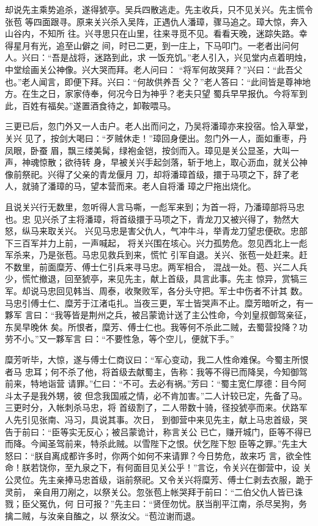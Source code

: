 却说先主乘势追杀，遂得猇亭。吴兵四散逃走。先主收兵，只不见关兴。先主慌令张苞
等四面跟寻。原来关兴杀入吴阵，正遇仇人潘璋，骤马追之。璋大惊，奔入山谷内，不知所
往。兴寻思只在山里，往来寻觅不见。看看天晚，迷踪失路。幸得星月有光，追至山僻之
间，时已二更，到一庄上，下马叩门。一老者出问何人。兴曰：“吾是战将，迷路到此，求
一饭充饥。”老人引入，兴见堂内点着明烛，中堂绘画关公神像。兴大哭而拜。老人问曰：
“将军何故哭拜？”兴曰：“此吾父也。”老人闻言，即便下拜。兴曰：“何故供养吾
父？”老人答曰：“此间皆是尊神地方。在生之日，家家侍奉，何况今日为神乎？老夫只望
蜀兵早早报仇。今将军到此，百姓有福矣。”遂置酒食待之，卸鞍喂马。

三更已后，忽门外又一人击户。老人出而问之，乃吴将潘璋亦来投宿。恰入草堂，关兴
见了，按剑大喝曰：“歹贼休走！”璋回身便出。忽门外一人，面如重枣，丹凤眼，卧蚕
眉，飘三缕美髯，绿袍金铠，按剑而入。璋见是关公显圣，大叫一声，神魂惊散；欲待转
身，早被关兴手起剑落，斩于地上，取心沥血，就关公神像前祭祀。兴得了父亲的青龙偃月
刀，却将潘璋首级，擐于马项之下，辞了老人，就骑了潘璋的马，望本营而来。老人自将潘
璋之尸拖出烧化。

且说关兴行无数里，忽听得人言马嘶，一彪军来到；为首一将，乃潘璋部将马忠也。忠
见兴杀了主将潘璋，将首级擐于马项之下，青龙刀又被兴得了，勃然大怒，纵马来取关兴。
兴见马忠是害父仇人，气冲牛斗，举青龙刀望忠便砍。忠部下三百军并力上前，一声喊起，
将关兴围在垓心。兴力孤势危。忽见西北上一彪军杀来，乃是张苞。马忠见救兵到来，慌忙
引军自退。关兴、张苞一处赶来。赶不数里，前面糜芳、傅士仁引兵来寻马忠。两军相合，
混战一处。苞、兴二人兵少，慌忙撤退，回至猇亭，来见先主，献上首级，具言此事。先主
惊异，赏犒三军。却说马忠回见韩当、周泰，收聚败军，各分头守把。军士中伤者不计其
数。马忠引傅士仁、糜芳于江渚屯扎。当夜三更，军士皆哭声不止。糜芳暗听之，有一夥军
言曰：“我等皆是荆州之兵，被吕蒙诡计送了主公性命，今刘皇叔御驾亲征，东吴早晚休
矣。所恨者，糜芳、傅士仁也。我等何不杀此二贼，去蜀营投降？功劳不小。”又一夥军言
曰：“不要性急，等个空儿，便就下手。”

糜芳听毕，大惊，遂与傅士仁商议曰：“军心变动，我二人性命难保。今蜀主所恨者马
忠耳；何不杀了他，将首级去献蜀主，告称：我等不得已而降吴，今知御驾前来，特地诣营
请罪。”仁曰：“不可。去必有祸。”芳曰：“蜀主宽仁厚德：目今阿斗太子是我外甥，彼
但念我国戚之情，必不肯加害。”二人计较已定，先备了马。三更时分，入帐刺杀马忠，将
首级割了，二人带数十骑，径投猇亭而来。伏路军人先引见张南、冯习，具说其事。次日，
到御营中来见先主，献上马忠首级，哭告于前曰：“臣等实无反心；被吕蒙诡计，称言关公
已亡，赚开城门，臣等不得已而降。今闻圣驾前来，特杀此贼。以雪陛下之恨。伏乞陛下恕
臣等之罪。”先主大怒曰：“朕自离成都许多时，你两个如何不来请罪？今日势危，故来巧
言，欲全性命！朕若饶你，至九泉之下，有何面目见关公乎！”言讫，令关兴在御营中，设
关公灵位。先主亲捧马忠首级，诣前祭祀。又令关兴将糜芳、傅士仁剥去衣服，跪于灵前，
亲自用刀剐之，以祭关公。忽张苞上帐哭拜于前曰：“二伯父仇人皆已诛戮；臣父冤仇，何
日可报？”先主曰：“贤侄勿忧。朕当削平江南，杀尽吴狗，务擒二贼，与汝亲自醢之，以
祭汝父。“苞泣谢而退。

